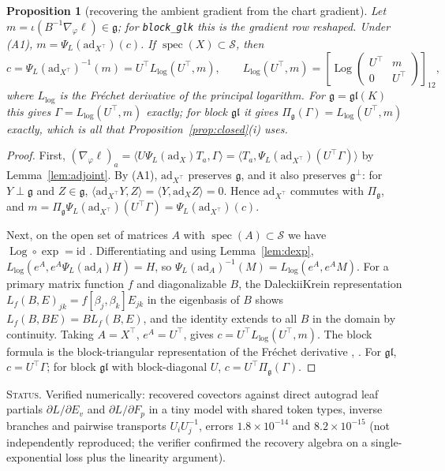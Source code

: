 \documentclass[11pt]{article}
\newtheorem{proposition}[theorem]{Proposition}
\theoremstyle{definition}
\theoremstyle{remark}
\newcommand{\g}{\mathfrak{g}}
\newcommand{\gl}{\mathfrak{gl}}
\newcommand{\ad}{\mathrm{ad}}
\newcommand{\Log}{\operatorname{Log}}
\newcommand{\spec}{\operatorname{spec}}
\newcommand{\ip}[2]{\langle #1, #2\rangle}
\newcommand{\ndash}{\textendash}
\newcommand{\status}[1]{\par\smallskip\noindent\textsc{Status.} #1\par\smallskip}
\begin{document}
\begin{proposition}[recovering the ambient gradient from the chart gradient]\label{prop:recovery}
Let $m=\iota(B^{-1}\nabla_\varphi\ell)\in\g$; for \texttt{block\_glk} this is the gradient row reshaped. Under (A1), $m=\Psi_L(\ad_{X^\top})(c)$. If $\spec(X)\subset\mathcal{S}$, then
\begin{equation}\label{eq:recovery}
c=\Psi_L(\ad_{X^\top})^{-1}(m)=U^\top L_{\log}(U^\top,m),\qquad L_{\log}(U^\top,m)=\left[\Log\begin{pmatrix}U^\top&m\\0&U^\top\end{pmatrix}\right]_{12},
\end{equation}
where $L_{\log}$ is the Fr\'echet derivative of the principal logarithm. For $\g=\gl(K)$ this gives $\Gamma=L_{\log}(U^\top,m)$ exactly; for block $\gl$ it gives $\Pi_\g(\Gamma)=L_{\log}(U^\top,m)$ exactly, which is all that Proposition~\ref{prop:closed}(i) uses.
\end{proposition}
\begin{proof}
First, $(\nabla_\varphi\ell)_a=\ip{U\Psi_L(\ad_X)T_a}{\Gamma}=\ip{T_a}{\Psi_L(\ad_{X^\top})(U^\top\Gamma)}$ by Lemma~\ref{lem:adjoint}. By (A1), $\ad_{X^\top}$ preserves $\g$, and it also preserves $\g^\perp$: for $Y\perp\g$ and $Z\in\g$, $\ip{\ad_{X^\top}Y}{Z}=\ip{Y}{\ad_XZ}=0$. Hence $\ad_{X^\top}$ commutes with $\Pi_\g$, and $m=\Pi_\g\Psi_L(\ad_{X^\top})(U^\top\Gamma)=\Psi_L(\ad_{X^\top})(c)$.

Next, on the open set of matrices $A$ with $\spec(A)\subset\mathcal{S}$ we have $\Log\circ\exp=\mathrm{id}$ \cite[Thm.~1.31]{Higham2008}. Differentiating and using Lemma~\ref{lem:dexp}, $L_{\log}(e^A,e^A\Psi_L(\ad_A)H)=H$, so $\Psi_L(\ad_A)^{-1}(M)=L_{\log}(e^A,e^AM)$. For a primary matrix function $f$ and diagonalizable $B$, the Daleckii\ndash Krein representation $L_f(B,E)_{jk}=f[\beta_j,\beta_k]E_{jk}$ in the eigenbasis of $B$ shows $L_f(B,BE)=BL_f(B,E)$, and the identity extends to all $B$ in the domain by continuity. Taking $A=X^\top$, $e^A=U^\top$, gives $c=U^\top L_{\log}(U^\top,m)$. The block formula is the block-triangular representation of the Fr\'echet derivative \cite{Mathias1996}, \cite[Thm.~3.6]{Higham2008}. For $\gl$, $c=U^\top\Gamma$; for block $\gl$ with block-diagonal $U$, $c=U^\top\Pi_\g(\Gamma)$.
\end{proof}
\status{Verified numerically: recovered covectors against direct autograd leaf partials $\partial L/\partial E_v$ and $\partial L/\partial F_p$ in a tiny model with shared token types, inverse branches and pairwise transports $U_iU_j^{-1}$, errors $1.8\times10^{-14}$ and $8.2\times10^{-15}$ (not independently reproduced; the verifier confirmed the recovery algebra on a single-exponential loss plus the linearity argument).}
\end{document}
